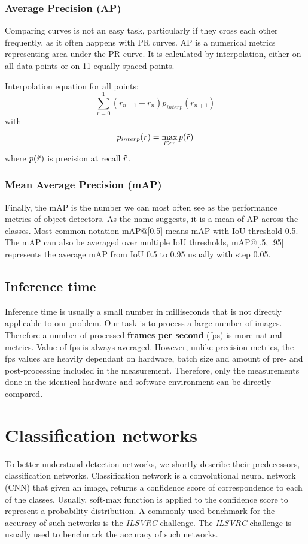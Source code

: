 \subsubsection{Average Precision (AP)}
Comparing curves is not an easy task, particularly if they cross each other frequently, as it often happens with PR curves. AP is a numerical metrics representing area under the PR curve. It is calculated by interpolation, either on all data points or on 11 equally spaced points.

Interpolation equation for all points:
$$\sum_{r=0}^1 (r_{n+1} - r_n ) p_{interp}(r_{n+1})$$
with
$$p_{interp}(r) = \max_{\Tilde{r} \geq r} p(\Tilde{r})$$
where $p(\Tilde{r})$ is precision at recall $\Tilde{r}$.

\subsubsection{Mean Average Precision (mAP)}
Finally, the mAP is the number we can most often see as the performance metrics of object detectors. As the name suggests, it is a mean of AP across the classes. Most common notation mAP@[0.5] means mAP with IoU threshold 0.5. The mAP can also be averaged over multiple IoU thresholds, mAP@[.5, .95] represents the average mAP from IoU 0.5 to 0.95 usually with step 0.05.

\subsection*{Inference time}
Inference time is usually a small number in milliseconds that is not directly applicable to our problem. Our task is to process a large number of images. Therefore a number of processed \textbf{frames per second} (fps) is more natural metrics. Value of fps is always averaged. However, unlike precision metrics, the fps values are heavily dependant on hardware, batch size and amount of pre- and post-processing included in the measurement. Therefore, only the measurements done in the identical hardware and software environment can be directly compared.

\section{Classification networks}
\label{sec:clsnets}
To better understand detection networks, we shortly describe their predecessors, classification networks. Classification network is a convolutional neural network (CNN) \cite[ch.~9]{bib:dlbook} that given an image, returns a confidence score of correspondence to each of the classes. Usually, soft-max function is applied to the confidence score to represent a probability distribution. A commonly used benchmark for the accuracy of such networks is the \textit{ILSVRC} challenge.
The \textit{ILSVRC} challenge is usually used to benchmark the accuracy of such networks.

